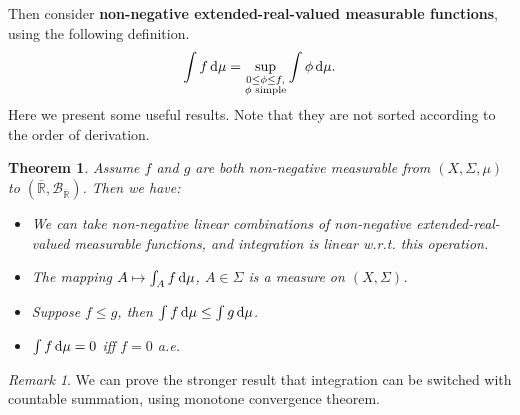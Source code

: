 \documentclass[openany]{book}
\newtheorem{theorem}{Theorem}[chapter]
\theoremstyle{definition}
\theoremstyle{remark}
\newtheorem*{remark}{Remark}
\begin{document}
Then consider \textbf{non-negative extended-real-valued measurable functions}, using the following definition.
\begin{equation*}
    \int f \dif\mu=\sup_{\substack{0\le\phi\le f,\\\phi\textrm{ simple}}}\int\phi \dif\mu.
\end{equation*}
Here we present some useful results. Note that they are not sorted according to the order of derivation.
\begin{theorem}
    Assume $f$ and $g$ are both non-negative measurable from $(X,\Sigma,\mu)$ to $(\overline{\mathbb{R}},\mathcal{B}_{\overline{\mathbb{R}}})$. Then we have:
    \begin{itemize}
        \item We can take non-negative linear combinations of non-negative extended-real-valued measurable functions, and integration is linear w.r.t. this operation.
        \item The mapping $A\mapsto\int_Af \dif\mu$, $A\in\Sigma$ is a measure on $(X,\Sigma)$.
        \item Suppose $f\le g$, then $\int f \dif\mu\le\int g \dif\mu$.
        \item $\int f \dif\mu=0$ iff $f=0$ a.e.
    \end{itemize}
\end{theorem}
\begin{remark}
    We can prove the stronger result that integration can be switched with countable summation, using monotone convergence theorem.
\end{remark}
\end{document}
